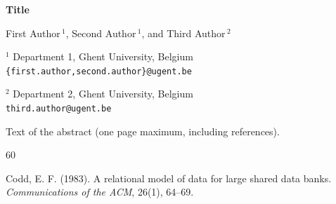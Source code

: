\documentclass[11pt]{article}
\begin{document}
\begin{center}
    \Large{\textbf{Title}}
    
    \vspace{0.5cm}
    
    
    \large{First Author$\,^1$, Second Author$\,^1$, and Third Author$\,^2$}
    
    \vspace{0.5cm}
    
    \normalsize
    
    
    $^1$ Department 1, Ghent University, Belgium\\
    \texttt{\{first.author,second.author\}@ugent.be}
    
    $^2$ Department 2, Ghent University, Belgium\\
    \texttt{third.author@ugent.be}
    
    \vspace{0.6cm}
    
\end{center}

Text of the abstract (one page maximum, including references).

\begin{thebibliography}{60}

 Codd, E. F. (1983). A relational model of data for large shared data banks. \textit{Communications of the ACM}, 26(1), 64--69.

\end{thebibliography}
\end{document}

